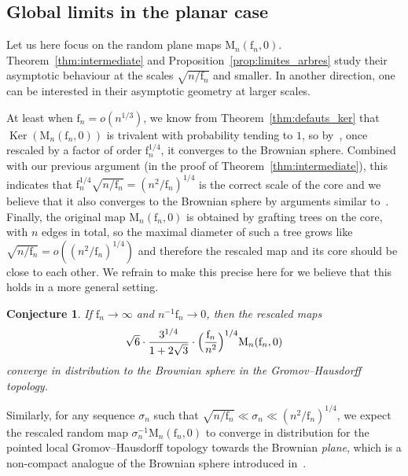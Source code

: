 \documentclass[10pt]{amsart}
\theoremstyle{plain}
\newtheorem{conjecture}[theorem]{Conjecture}
\theoremstyle{definition}
\theoremstyle{remark}
\newcommand{\Map}{\mathrm{M}}
\newcommand{\face}{\mathrm{f}}
\DeclareMathOperator{\Ker}{Ker}
\begin{document}
\subsection{Global limits in the planar case}
\label{ssec:TBM}

Let us here focus on the random plane maps $\Map_n(\face_n, 0)$. Theorem~\ref{thm:intermediate} and Proposition~\ref{prop:limites_arbres} study their asymptotic behaviour at the scales $\sqrt{n/\face_n}$ and smaller.
In another direction, one can be interested in their asymptotic geometry at larger scales.

At least when $\face_n = o(n^{1/3})$, we know from Theorem~\ref{thm:defauts_ker} that $\Ker(\Map_n(\face_n, 0))$ is trivalent with probability tending to $1$, so by~\cite[Cor.\,23]{CLG19}, once rescaled by a factor of order $\face_n^{1/4}$, it converges to the Brownian sphere. Combined with our previous argument (\eg in the proof of Theorem~\ref{thm:intermediate}), this indicates that $\face_n^{1/4} \sqrt{n/ \face_n} = (n^2/\face_n)^{1/4}$ is the correct scale of the core and we believe that it also converges to the Brownian sphere by arguments similar to~\cite{CLG19}. Finally, the original map $\Map_n(\face_n, 0)$ is obtained by grafting trees on the core, with $n$ edges in total, so the maximal diameter of such a tree grows like
$
\sqrt{n/\face_n} = o((n^2/\face_n)^{1/4})$ and therefore the rescaled map and its core should be close to each other.
We refrain to make this precise here for we believe that this holds in a more general setting.

\begin{conjecture}\label{conjecture}
If $\face_n \to \infty$ and $n^{-1} \face_n \to 0$, then the rescaled maps
\[
\sqrt{6} \cdot \frac{3^{1/4}}{1+2\sqrt{3}} \cdot \Bigl(\frac{\face_n}{n^2}\Bigr)^{1/4} \Map_n(\face_n, 0)
\]
converge in distribution to the Brownian sphere in the Gromov--Hausdorff topology.
\end{conjecture}

Similarly, for any sequence $\sigma_n$ such that $\sqrt{n/\face_n} \ll \sigma_n \ll (n^2/\face_n)^{1/4}$, we expect the rescaled random map $\sigma_n^{-1} \Map_n(\face_{n},0)$ to converge in distribution for the pointed local Gromov--Hausdorff topology towards the Brownian \emph{plane}, which is a non-compact analogue of the Brownian sphere introduced in~\cite{CLG14}.
\end{document}
